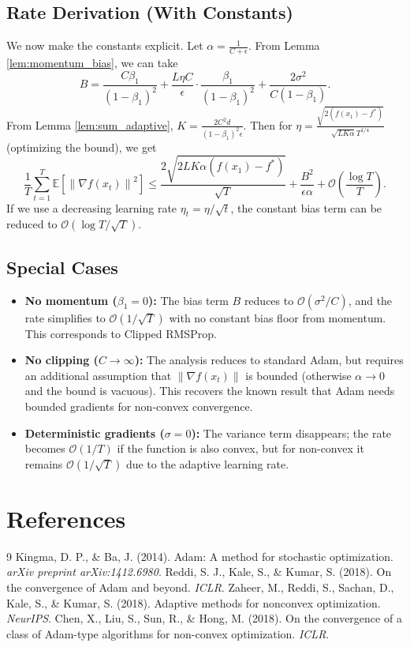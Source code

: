 \documentclass{article}
\newcommand{\E}{\mathbb{E}}
\newcommand{\norm}[1]{\left\| #1 \right\|}
\begin{document}
\subsection*{Rate Derivation (With Constants)}
We now make the constants explicit. Let $\alpha = \frac{1}{C+\epsilon}$. From Lemma \ref{lem:momentum_bias}, we can take
\[
    B = \frac{C \beta_1}{(1-\beta_1)^2} + \frac{L \eta C}{\epsilon} \cdot \frac{\beta_1}{(1-\beta_1)^2} + \frac{2\sigma^2}{C(1-\beta_1)}.
\]
From Lemma \ref{lem:sum_adaptive}, $K = \frac{2 C^2 d}{(1-\beta_1)^2 \epsilon}$. Then for $\eta = \frac{\sqrt{2(f(x_1)-f^*)}}{\sqrt{L K \alpha} T^{1/4}}$ (optimizing the bound), we get
\[
    \frac{1}{T} \sum_{t=1}^T \E[\norm{\nabla f(x_t)}^2] \le \frac{2\sqrt{2 L K \alpha (f(x_1)-f^*)}}{\sqrt{T}} + \frac{B^2}{\epsilon \alpha} + \mathcal{O}\left(\frac{\log T}{T}\right).
\]
If we use a decreasing learning rate $\eta_t = \eta/\sqrt{t}$, the constant bias term can be reduced to $\mathcal{O}(\log T/\sqrt{T})$.

\subsection*{Special Cases}
\begin{itemize}
    \item \textbf{No momentum ($\beta_1=0$):} The bias term $B$ reduces to $\mathcal{O}(\sigma^2/C)$, and the rate simplifies to $\mathcal{O}(1/\sqrt{T})$ with no constant bias floor from momentum. This corresponds to Clipped RMSProp.
    \item \textbf{No clipping ($C \to \infty$):} The analysis reduces to standard Adam, but requires an additional assumption that $\norm{\nabla f(x_t)}$ is bounded (otherwise $\alpha \to 0$ and the bound is vacuous). This recovers the known result that Adam needs bounded gradients for non-convex convergence.
    \item \textbf{Deterministic gradients ($\sigma=0$):} The variance term disappears; the rate becomes $\mathcal{O}(1/T)$ if the function is also convex, but for non-convex it remains $\mathcal{O}(1/\sqrt{T})$ due to the adaptive learning rate.
\end{itemize}

\section*{References}
\begin{thebibliography}{9}
 Kingma, D. P., \& Ba, J. (2014). Adam: A method for stochastic optimization. \textit{arXiv preprint arXiv:1412.6980}.
 Reddi, S. J., Kale, S., \& Kumar, S. (2018). On the convergence of Adam and beyond. \textit{ICLR}.
 Zaheer, M., Reddi, S., Sachan, D., Kale, S., \& Kumar, S. (2018). Adaptive methods for nonconvex optimization. \textit{NeurIPS}.
 Chen, X., Liu, S., Sun, R., \& Hong, M. (2018). On the convergence of a class of Adam-type algorithms for non-convex optimization. \textit{ICLR}.
\end{thebibliography}
\end{document}
